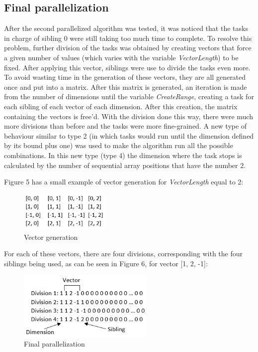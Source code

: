 \documentclass[conference]{IEEEtran}
\begin{document}
\subsection{Final parallelization}
After the second parallelized algorithm was tested, it was noticed that the tasks in charge of sibling 0 were still taking too much time to complete. To resolve this problem, further division of the tasks was obtained by creating vectors that force a given number of values (which varies with the variable \emph{VectorLength}) to be fixed. After applying this vector, siblings were use to divide the tasks even more. 
To avoid wasting time in the generation of these vectors, they are all generated once and put into a matrix. After this matrix is generated, an iteration is made from the number of dimensions until the variable \emph{CreateRange}, creating a task for each sibling of each vector of each dimension. After this creation, the matrix containing the vectors is free'd.
With the division done this way, there were much more divisions than before and the tasks were more fine-grained. A new type of behaviour similar to type 2 (in which tasks would run until the dimension defined by its bound plus one) was used to make the algorithm run all the possible combinations. In this new type (type 4) the dimension where the task stops is calculated by the number of sequential array positions that have the number 2. 

Figure 5 has a small example of vector generation for \emph{VectorLength} equal to 2:

\begin{figure}[ht!]
\centering
\includegraphics[width=43mm]{imgParallel/GeracaoVetores}
\caption{Vector generation}
\end{figure}

For each of these vectors, there are four divisions, corresponding with the four siblings being used, as can be seen in Figure 6, for vector [1, 2, -1]:

\begin{figure}[ht!]
\centering
\includegraphics[width=65mm]{imgParallel/ParalelizacaoFinal}
\caption{Final parallelization}
\end{figure}
\end{document}
